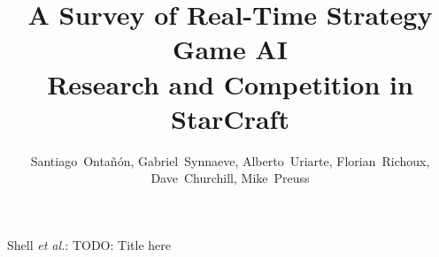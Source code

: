 \documentclass[journal]{IEEEtran}
\begin{document}
%
\title{A Survey of Real-Time Strategy Game AI\\ Research and Competition in StarCraft}
%
%
%


\author{Santiago~Onta\~{n}\'{o}n,
        Gabriel~Synnaeve,
        Alberto~Uriarte,
        Florian~Richoux,
        Dave~Churchill,
        Mike~Preuss
}

% 
%

%
{Shell \MakeLowercase{\textit{et al.}}: TODO: Title here}
\end{document}
